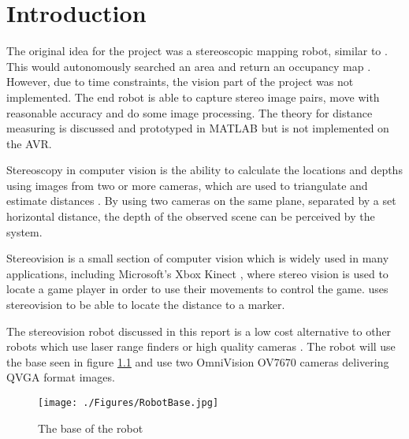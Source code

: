 \chapter{Introduction} \label{Chapter:Introduction}

%
%
%
%


The original idea for the project was a stereoscopic mapping robot, similar to \cite{Pirobot}. This would autonomously searched an area and return an occupancy map \cite{thrun2003learning}. However, due to time constraints, the vision part of the project was not implemented. The end robot is able to capture stereo image pairs, move with reasonable accuracy and do some image processing. The theory for distance measuring is discussed and prototyped in MATLAB but is not implemented on the AVR.

Stereoscopy in computer vision is the ability to calculate the locations and depths using images from two or more cameras, which are used to triangulate and estimate distances \citep{Saxena:DepthEstimation}. By using two cameras on the same plane, separated by a set horizontal distance, the depth of the observed scene can be perceived by the system.

Stereovision is a small section of computer vision which is widely used in many applications, including Microsoft's Xbox Kinect \citep{Microsoft:Kinect}, where stereo vision is used to locate a game player in order to use their movements to control the game. \cite{Mrovlje:Distance_Stereoscopic} uses stereovision to be able to locate the distance to a marker. 

The stereovision robot discussed in this report is a low cost alternative to other robots which use laser range finders or high quality cameras \citep{Se:MappingRobot}. The robot will use the base seen in figure \ref{fig:RobotBase} and use two OmniVision OV7670 cameras delivering QVGA format images.


\begin{figure}
\texttt{[image: ./Figures/RobotBase.jpg]}
\caption{The base of the robot}
\label{fig:RobotBase}
\end{figure}


